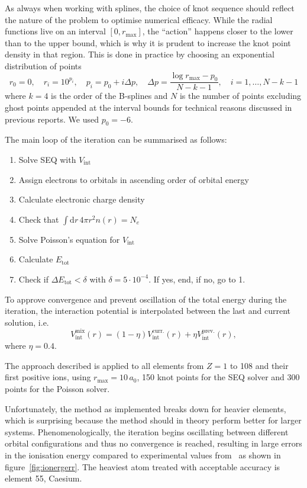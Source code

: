 \documentclass[a4paper,DIV=12,english]{scrartcl}
\begin{document}
As always when working with splines, the choice of knot sequence should reflect the nature of the problem to optimise numerical efficacy. While the radial functions live on an interval $[0, r_\text{max}]$, the \enquote{action} happens closer to the lower than to the upper bound, which is why it is prudent to increase the knot point density in that region. This is done in practice by choosing an exponential distribution of points
\begin{equation}
    r_0 = 0,\quad r_{i} = 10^{p_i}, \quad p_i = p_0 + i\Delta p, \quad \Delta p = \frac{\log r_\text{max} - p_0}{N-k-1}, \quad i = 1,\dots,N-k-1
\end{equation}
where $k=4$ is the order of the B-splines and $N$ is the number of points excluding ghost points appended at the interval bounds for technical reasons discussed in previous reports. We used $p_0 = -6$.

The main loop of the iteration can be summarised as follows:
\begin{enumerate}
    \item Solve SEQ with $V_\text{int}$
    \item Assign electrons to orbitals in ascending order of orbital energy
    \item Calculate electronic charge density 
    \item Check that $\int \text{d}r\, 4\pi r^2 n(r) = N_e$
    \item Solve Poisson's equation for $V_\text{int}$
    \item Calculate $E_\text{tot}$
    \item Check if $\Delta E_\text{tot} < \delta$ with $\delta = 5\cdot 10^{-4}$. If yes, end, if no, go to 1.
\end{enumerate}

To approve convergence and prevent oscillation of the total energy during the iteration, the interaction potential is interpolated between the last and current solution, i.e.
\begin{equation}
    V_\text{int}^{\text{mix}}(r) = (1-\eta)V_\text{int}^{\text{curr.}}(r) + \eta V_\text{int}^{\text{prev.}}(r),
\end{equation}
where $\eta=0.4$.

The approach described is applied to all elements from $Z=1$ to 108 and their first positive ions, using $r_\text{max}=10\,a_0$, 150 knot points for the SEQ solver and 300 points for the Poisson solver. 

Unfortunately, the method as implemented breaks down for heavier elements, which is surprising because the method should in theory perform better for larger systems. Phenomenologically, the iteration begins oscillating between different orbital configurations and thus no convergence is reached, resulting in large errors in the ionisation energy compared to experimental values from~\cite{NIST_ASD} as shown in figure~\ref{fig:ionergerr}. The heaviest atom treated with acceptable accuracy is element 55, Caesium.
\end{document}
